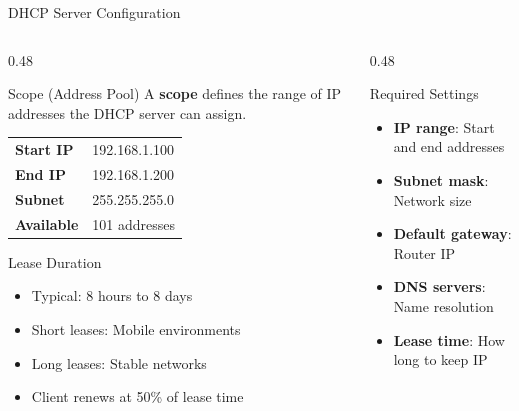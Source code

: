 \documentclass[aspectratio=169, 11pt]{beamer}
\newcommand{\keyterm}[1]{\textbf{\textcolor{rctcblue}{#1}}}
\begin{document}
\begin{frame}{DHCP Server Configuration}
    \begin{columns}[T]
        \begin{column}{0.48\textwidth}
            \begin{block}{Scope (Address Pool)}
                \small
                A \keyterm{scope} defines the range of IP addresses the DHCP server can assign.
                
                \vspace{0.2em}
                \begin{tabular}{l l}
                    \textbf{Start IP} & 192.168.1.100 \\
                    \textbf{End IP} & 192.168.1.200 \\
                    \textbf{Subnet} & 255.255.255.0 \\
                    \textbf{Available} & 101 addresses \\
                \end{tabular}
            \end{block}
            
            \vspace{0.2em}
            \begin{block}{Lease Duration}
                \small
                \begin{itemize}\setlength{\itemsep}{1pt}
                    \item Typical: 8 hours to 8 days
                    \item Short leases: Mobile environments
                    \item Long leases: Stable networks
                    \item Client renews at 50\% of lease time
                \end{itemize}
            \end{block}
        \end{column}
        \begin{column}{0.48\textwidth}
            \begin{block}{Required Settings}
                \small
                \begin{itemize}\setlength{\itemsep}{2pt}
                    \item \textbf{IP range}: Start and end addresses
                    \item \textbf{Subnet mask}: Network size
                    \item \textbf{Default gateway}: Router IP
                    \item \textbf{DNS servers}: Name resolution
                    \item \textbf{Lease time}: How long to keep IP
                \end{itemize}
            \end{block}
            

\end{column}
\end{columns}
\end{frame}
\end{document}
